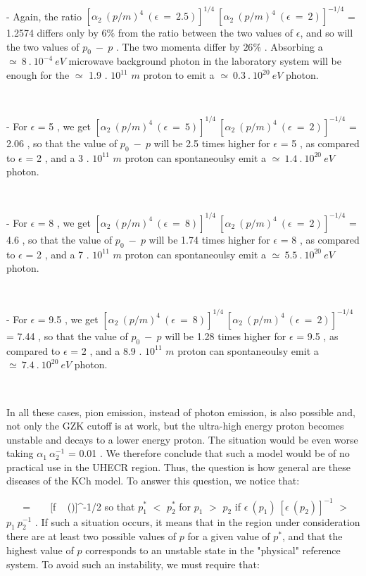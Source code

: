 \documentclass[a4paper,12pt,dvips]{article}
\begin{document}
~ 

- Again, the ratio $[\alpha_2 ~(p/m)^4 ~ (\epsilon ~ = ~ 2.5)]^{1/4} ~ [\alpha_2 ~(p/m)^4 ~ (\epsilon ~ = ~ 2)]^{-1/4}$ = 1.2574 differs only by $6\% $ from the ratio between the two values of $\epsilon $, and so will the two values of $p_0 ~ - ~ p$ . The two momenta differ by $26\%$ . Absorbing a $\simeq ~ 8 ~. ~ 10^{-4} ~ eV$ microwave background photon in the laboratory system will be enough for the $\simeq $ 1.9 . $10^{11}$ $m$ proton to emit a $\simeq ~ 0.3 ~ . ~ 10^{20} ~ eV$ photon. 

~ 

- For $\epsilon $ = 5 , we get $[\alpha_2 ~(p/m)^4 ~ (\epsilon ~ = ~ 5)]^{1/4} ~ [\alpha_2 ~(p/m)^4 ~ (\epsilon ~ = ~ 2)]^{-1/4}$ = 2.06 , so that the value of $p_0 ~ - ~ p$ will be 2.5 times higher for $\epsilon $ = 5 , as compared to $\epsilon $ = 2 , and a 3 . $10^{11}$ $m$ proton can spontaneoulsy emit a $\simeq ~ 1.4 ~ . ~ 10^{20} ~ eV$ photon. 

~ 

- For $\epsilon $ = 8 , we get $[\alpha_2 ~(p/m)^4 ~ (\epsilon ~ = ~ 8)]^{1/4} ~ [\alpha_2 ~(p/m)^4 ~ (\epsilon ~ = ~ 2)]^{-1/4}$ = 4.6 , so that the value of $p_0 ~ - ~ p$ will be 1.74 times higher for $\epsilon $ = 8 , as compared to $\epsilon $ = 2 , and a 7 . $10^{11}$ $m$ proton can spontaneoulsy emit a $\simeq ~ 5.5 ~ . ~ 10^{20} ~ eV$ photon. 

~ 

- For $\epsilon $ = 9.5 , we get $[\alpha_2 ~(p/m)^4 ~ (\epsilon ~ = ~ 8)]^{1/4} ~ [\alpha_2 ~(p/m)^4 ~ (\epsilon ~ = ~ 2)]^{-1/4}$ = 7.44 , so that the value of $p_0 ~ - ~ p$ will be 1.28 times higher for $\epsilon $ = 9.5 , as compared to $\epsilon $ = 2 , and a 8.9 . $10^{11}$ $m$ proton can spontaneoulsy emit a $\simeq ~ 7.4 ~ . ~ 10^{20} ~ eV$ photon. 

~ 

In all these cases, pion emission, instead of photon emission, is also possible and, not only the GZK cutoff is at work, but the ultra-high energy proton becomes unstable and decays to a lower energy proton. The situation would be even worse taking $\alpha_1 ~ \alpha_2^{-1}$ = 0.01 . We therefore conclude that such a model would be of no practical use in the UHECR region. Thus, the question is how general are these diseases of the KCh model. To answer this question, we notice that:

\equation 
\epsilon ~ ~ = ~ ~ [f ~ (\xi )]^{-1/2}
\endequation
\noindent
so that $p^*_1$ $<$ $p^*_2$ for $p_1$ $>$ $p_2$ if $\epsilon ~ (p_1) ~ [\epsilon ~ (p_2)]^{-1}$ $>$ $p_1 ~ p_2^{-1}$ . If such a situation occurs, it means that in the region under consideration there are at least two possible values of $p$ for a given value of $p^*$, and that the highest value of $p$ corresponds to an unstable state in the "physical" reference system. To avoid such an instability, we must require that:
\end{document}
